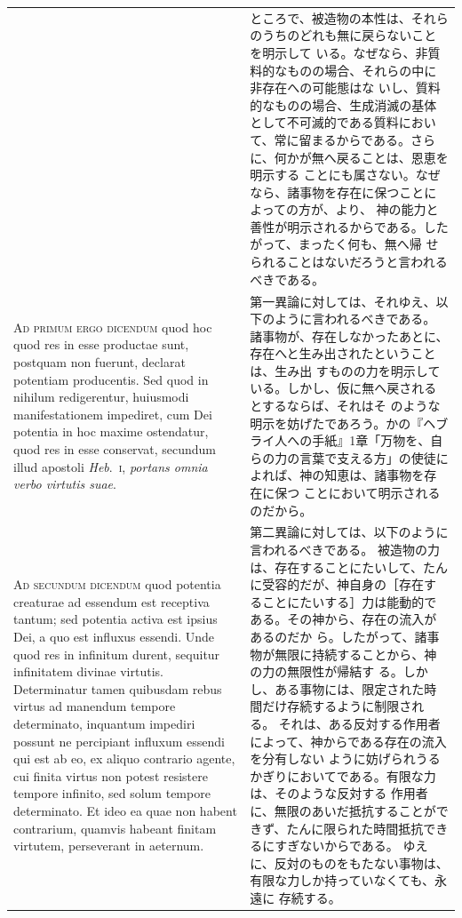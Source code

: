 \documentclass[paper=a4paper,fontsize=10pt,jafontsize=9pt,titlepage]{jlreq}
\begin{document}
\begin{longtable}{p{21em}p{21em}}
&

ところで、被造物の本性は、それらのうちのどれも無に戻らないことを明示して
 いる。なぜなら、非質料的なものの場合、それらの中に非存在への可能態はな
 いし、質料的なものの場合、生成消滅の基体として不可滅的である質料におい
 て、常に留まるからである。さらに、何かが無へ戻ることは、恩恵を明示する
 ことにも属さない。なぜなら、諸事物を存在に保つことによっての方が、より、
 神の能力と善性が明示されるからである。したがって、まったく何も、無へ帰
 せられることはないだろうと言われるべきである。

\\


{\scshape Ad primum ergo dicendum} quod hoc quod res in
esse productae sunt, postquam non fuerunt, declarat potentiam
producentis. Sed quod in nihilum redigerentur, huiusmodi manifestationem
impediret, cum Dei potentia in hoc maxime ostendatur, quod res in esse
conservat, secundum illud apostoli {\itshape Heb}.~{\scshape i}, {\itshape portans omnia verbo virtutis
suae}.

&

第一異論に対しては、それゆえ、以下のように言われるべきである。
諸事物が、存在しなかったあとに、存在へと生み出されたということは、生み出
 すものの力を明示している。しかし、仮に無へ戻されるとするならば、それはそ
 のような明示を妨げたであろう。かの『ヘブライ人への手紙』1章「万物を、自
 らの力の言葉で支える方」の使徒によれば、神の知恵は、諸事物を存在に保つ
 ことにおいて明示されるのだから。


\\


{\scshape Ad secundum dicendum} quod potentia creaturae
ad essendum est receptiva tantum; sed potentia activa est ipsius Dei, a
quo est influxus essendi. Unde quod res in infinitum durent, sequitur
infinitatem divinae virtutis. Determinatur tamen quibusdam rebus virtus
ad manendum tempore determinato, inquantum impediri possunt ne
percipiant influxum essendi qui est ab eo, ex aliquo contrario agente,
cui finita virtus non potest resistere tempore infinito, sed solum
tempore determinato. Et ideo ea quae non habent contrarium, quamvis
habeant finitam virtutem, perseverant in aeternum.

&

第二異論に対しては、以下のように言われるべきである。
被造物の力は、存在することにたいして、たんに受容的だが、神自身の［存在す
 ることにたいする］力は能動的である。その神から、存在の流入があるのだか
 ら。したがって、諸事物が無限に持続することから、神の力の無限性が帰結す
 る。しかし、ある事物には、限定された時間だけ存続するように制限される。
 それは、ある反対する作用者によって、神からである存在の流入を分有しない
 ように妨げられうるかぎりにおいてである。有限な力は、そのような反対する
 作用者に、無限のあいだ抵抗することができず、たんに限られた時間抵抗でき
 るにすぎないからである。
ゆえに、反対のものをもたない事物は、有限な力しか持っていなくても、永遠に
 存続する。


\end{longtable}
\end{document}

